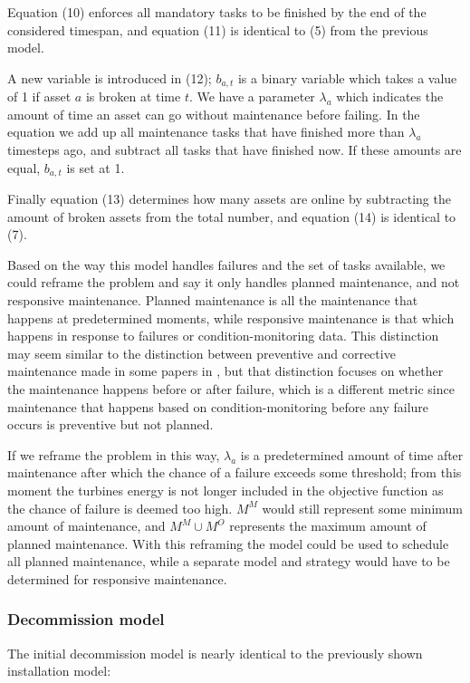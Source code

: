 \documentclass[a4paper,12pt]{article}
\begin{document}
Equation (10) enforces all mandatory tasks to be finished by the end of the considered timespan, and equation (11) is identical to (5) from the previous model. 

A new variable is introduced in (12); $b_{a,t}$ is a binary variable which takes a value of 1 if asset $a$ is broken at time $t$. We have a parameter $\lambda_a$ which indicates the amount of time an asset can go without maintenance before failing. In the equation we add up all maintenance tasks that have finished more than $\lambda_a$ timesteps ago, and subtract all tasks that have finished now. If these amounts are equal, $b_{a,t}$ is set at 1. 

Finally equation (13) determines how many assets are online by subtracting the amount of broken assets from the total number, and equation (14) is identical to (7). 

\bigskip

Based on the way this model handles failures and the set of tasks available, we could reframe the problem and say it only handles planned maintenance, and not responsive maintenance. Planned maintenance is all the maintenance that happens at predetermined moments, while responsive maintenance is that which happens in response to failures or condition-monitoring data. This distinction may seem similar to the distinction between preventive and corrective maintenance made in some papers in , but that distinction focuses on whether the maintenance happens before or after failure, which is a different metric since maintenance that happens based on condition-monitoring before any failure occurs is preventive but not planned. 

If we reframe the problem in this way, $\lambda_a$ is a predetermined amount of time after maintenance after which the chance of a failure exceeds some threshold; from this moment the turbines energy is not longer included in the objective function as the chance of failure is deemed too high. $M^M$ would still represent some minimum amount of maintenance, and $M^M \cup M^O$ represents the maximum amount of planned maintenance. With this reframing the model could be used to schedule all planned maintenance, while a separate model and strategy would have to be determined for responsive maintenance. 

\subsubsection{Decommission model}
The initial decommission model is nearly identical to the previously shown installation model:
\end{document}
